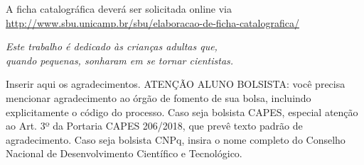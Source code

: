 \documentclass[
	oldfontcommands,
	sumario=tradicional,
	12pt,      %
	openright, %
	oneside,   %
	a4paper,   %
	english, %
	brazil   %
	]{00-configs/imecc-unicamp}
\begin{document}
	\frenchspacing %
	
		\pretextual
		
		\imprimirprimeirafolha %
		
			\imprimirfolhaderosto
		
			\begin{fichacatalografica}
				\begin{center}
					{\ABNTEXchapterfont\large A ficha catalográfica deverá ser solicitada online via \url{http://www.sbu.unicamp.br/sbu/elaboracao-de-ficha-catalografica/}}
				\end{center}
			\end{fichacatalografica}
		
			\begin{folhadeaprovacao}
			\end{folhadeaprovacao}
		
			\begin{dedicatoria}
				\vspace*{\fill}
				\centering
				\noindent
				\textit{
					Este trabalho é dedicado às crianças adultas que,\\
					quando pequenas, sonharam em se tornar cientistas.
				}
				\vspace*{\fill}
			\end{dedicatoria}
		
			\begin{agradecimentos}
				Inserir aqui os agradecimentos. ATENÇÃO ALUNO BOLSISTA: você precisa mencionar agradecimento ao órgão de fomento de sua bolsa, incluindo explicitamente o código do processo. Caso seja bolsista CAPES, especial atenção ao Art. 3º da Portaria CAPES 206/2018, que prevê texto padrão de agradecimento. Caso seja bolsista CNPq, insira o nome completo do Conselho Nacional de Desenvolvimento Científico e Tecnológico.
			\end{agradecimentos}
			
\end{document}
